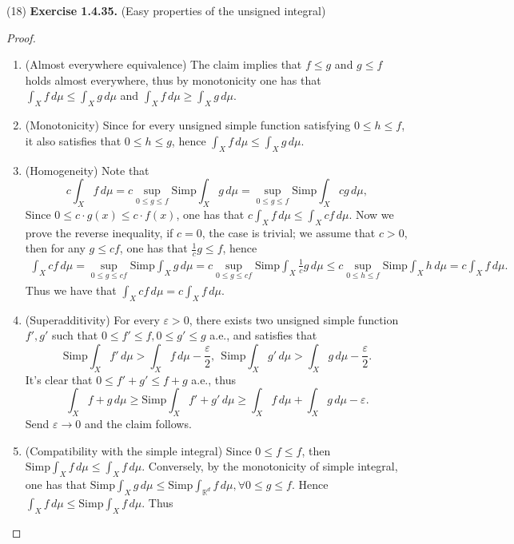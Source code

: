 \documentclass[a4paper]{article}
\begin{document}
(18) {\bfseries Exercise 1.4.35.} (Easy properties of the unsigned integral) \begin{proof}\ 
\begin{enumerate}[label = (\roman*)]
    \item (Almost everywhere equivalence) The claim implies that $f \leq g$ and $g \leq f$ holds almost everywhere, 
    thus by monotonicity one has that $\int_X f \,d\mu \leq \int_X g \,d\mu$ and $\int_X f \,d\mu \geq \int_X g \,d\mu$.
    \item (Monotonicity) Since for every unsigned simple function satisfying $0 \leq h \leq f$, it also satisfies that
    $0 \leq h \leq g$, hence $\int_X f \,d\mu \leq \int_X g \,d\mu$.
    \item (Homogeneity) Note that $$
    c\int_X f \,d\mu = c\sup_{0 \leq g \leq f} \mathrm{Simp}\int_X g\,d\mu
    = \sup_{0 \leq g \leq f} \mathrm{Simp}\int_X cg\,d\mu,
    $$Since $0 \leq c\cdot g(x) \leq c\cdot f(x)$, one has that $c\int_X f \,d\mu \leq 
    \int_X cf \,d\mu$. Now we prove the reverse inequality, if $c = 0$, the case is trivial;
    we assume that $c > 0$, then for any $g \leq cf$, one has that $\frac{1}{c}g \leq f$, hence \begin{multline*}
    \int_X cf \,d\mu = \sup_{0 \leq g \leq cf} \mathrm{Simp}\int_X g \,d\mu
    = c \sup_{0 \leq g \leq cf} \mathrm{Simp}\int_X \frac{1}{c} g \,d\mu \leq
    c \sup_{0 \leq h \leq f} \mathrm{Simp}\int_X h \,d\mu = c\int_X f \,d\mu.
    \end{multline*}
    Thus we have that $\int_X cf \,d\mu = c\int_X f \,d\mu$.
    \item (Superadditivity) For every $\varepsilon > 0$, there exists two unsigned simple function $f', g'$ such that 
    $0 \leq f' \leq f, 0 \leq g' \leq g$ a.e., and satisfies that $$
    \mathrm{Simp}\int_X f'\,d\mu > \int_X f \,d\mu - \frac{\varepsilon}{2},\ \ 
    \mathrm{Simp}\int_X g'\,d\mu > \int_X g \,d\mu - \frac{\varepsilon}{2}.
    $$It's clear that $0 \leq f' + g' \leq f + g$ a.e., thus $$
    \int_X f + g \,d\mu \geq \mathrm{Simp}\int_X f' + g' \,d\mu\geq
    \int_X f \,d\mu + \int_X g \,d\mu - \varepsilon.
    $$Send $\varepsilon \to 0$ and the claim follows.
    \item (Compatibility with the simple integral) Since $0 \leq f \leq f$, then $\mathrm{Simp}\int_X f \,d\mu\leq
    \int_X f \,d\mu$. Conversely, by the monotonicity of simple integral, one has that 
    $\mathrm{Simp}\int_X g \,d\mu \leq \mathrm{Simp}\int_{\mathbb{R}^d} f \,d\mu, \forall 0 \leq g \leq f$.
    Hence $ \int_X f \,d\mu \leq \mathrm{Simp}\int_X f \,d\mu$. Thus

\end{enumerate}
\end{proof}
\end{document}
